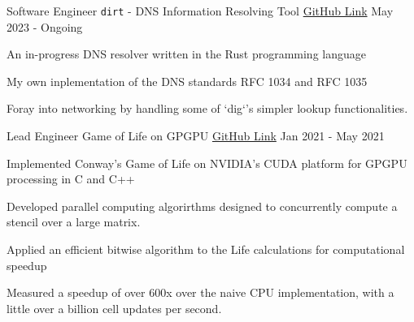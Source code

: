 

\begin{cventries}

  \cventry
    {Software Engineer} %
    {\texttt{dirt} - DNS Information Resolving Tool} %
    {\href{https://github.com/nbarrios1337/dirt}{GitHub Link}} %
    {May 2023 - Ongoing} %
    {
      \begin{cvitems} %
        \item An in-progress DNS resolver written in the Rust programming language
        \item My own inplementation of the DNS standards RFC 1034 and RFC 1035
        \item Foray into networking by handling some of `dig`'s simpler lookup functionalities.
      \end{cvitems}
  }

  \cventry
    {Lead Engineer} %
    {Game of Life on GPGPU} %
    {\href{https://github.com/nbarrios1337/bitwise-GoL-GPGPU}{GitHub Link}} %
    {Jan 2021 - May 2021} %
    {
      \begin{cvitems} %
        \item Implemented Conway's Game of Life on NVIDIA's CUDA platform for GPGPU processing in C and C++
        \item Developed parallel computing algorirthms designed to concurrently compute a stencil over a large matrix.
        \item Applied an efficient bitwise algorithm to the Life calculations for computational speedup
        \item Measured a speedup of over 600x over the naive CPU implementation, with a little over a billion cell updates per second.
      \end{cvitems}
    }


\end{cventries}
